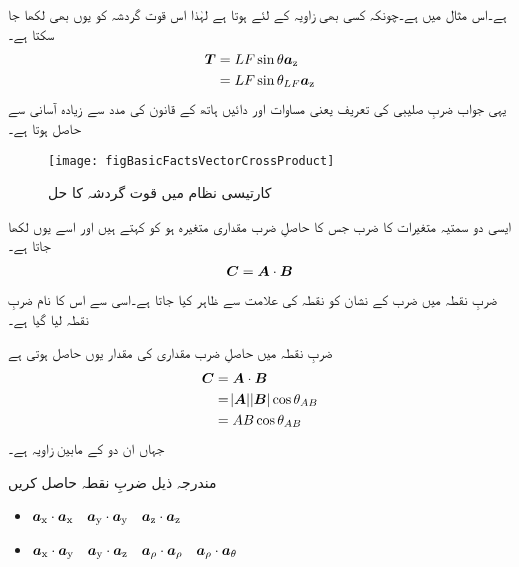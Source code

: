 ہے۔اس مثال میں  ہے۔چونکہ کسی بھی زاویہ    کے لئے  ہوتا ہے لہٰذا اس قوت گردشہ کو یوں بھی لکھا جا سکتا ہے۔
\begin{align*}
{\ensuremath{{\boldsymbol{T}}}}&=LF\sin \theta {\boldsymbol{a}}_{\textup{z}}\\
&=L F \sin \theta_{LF}{\boldsymbol{a}}_{\textup{z}}
\end{align*}
یہی جواب ضربِ صلیبی کی تعریف یعنی مساوات  اور دائیں ہاتھ کے قانون کی مدد سے زیادہ آسانی سے حاصل ہوتا ہے۔
%
\begin{figure}
\centering
\texttt{[image: figBasicFactsVectorCrossProduct]}
\caption{کارتیسی نظام میں قوت گردشہ کا حل}
\label{شکل_حقائق_کارتیسی_مروڑ_کا_حل}
\end{figure}
%
ایسی دو سمتیہ متغیرات کا ضرب جس کا حاصلِ ضرب مقداری متغیرہ ہو کو  کہتے ہیں اور اسے یوں لکھا جاتا ہے۔
\begin{align}
{\ensuremath{{\boldsymbol{C}}}}={{\boldsymbol{A}}} \cdot {\ensuremath{{\boldsymbol{B}}}}
\end{align}
ضربِ نقطہ میں ضرب کے نشان کو نقطہ کی علامت سے ظاہر کیا جاتا ہے۔اسی سے اس کا نام ضربِ نقطہ لیا گیا ہے۔

ضربِ نقطہ میں حاصلِ ضرب مقداری کی مقدار یوں حاصل ہوتی ہے
\begin{gather}
\begin{aligned}\label{مساوات_بنیادی_ضرب_نقطہ_تعریف}
{\ensuremath{{\boldsymbol{C}}}}&={{\boldsymbol{A}}} \cdot {\ensuremath{{\boldsymbol{B}}}}\\
&=\abs{{{\boldsymbol{A}}}} \abs{{{\boldsymbol{B}}}} \cos \theta_{AB}\\
&=A B \cos \theta_{AB}
\end{aligned}
\end{gather}
جہاں  ان دو کے مابین زاویہ ہے۔

مندرجہ ذیل ضربِ نقطہ حاصل کریں
\begin{itemize}
\item
${\boldsymbol{a}}_{\textup{x}} \cdot {\boldsymbol{a}}_{\textup{x}} \quad {\boldsymbol{a}}_{\textup{y}} \cdot {\boldsymbol{a}}_{\textup{y}} \quad {\boldsymbol{a}}_{\textup{z}} \cdot {\boldsymbol{a}}_{\textup{z}}$\\
\item
${\boldsymbol{a}}_{\textup{x}} \cdot {\boldsymbol{a}}_{\textup{y}} \quad {\boldsymbol{a}}_{\textup{y}} \cdot {\boldsymbol{a}}_{\textup{z}} \quad {\boldsymbol{a}}_{\rho} \cdot {\boldsymbol{a}}_{\rho} \quad {\boldsymbol{a}}_{\rho} \cdot {\boldsymbol{a}}_{\theta}$
\end{itemize}

